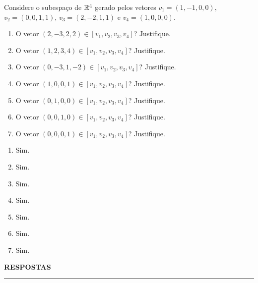 \documentclass[12pt]{exam}
\begin{document}
\begin{exercicio}
  Considere o subespaço de $\mathbb{R}^4$ gerado pelos vetores $v_1 = (1, -1, 0, 0)$, $v_2 = (0, 0, 1, 1)$, $v_3 = (2, -2, 1, 1)$ e $v_4 = (1, 0, 0, 0)$.
  \begin{enumerate}[label={\alph*})]
    \item O vetor $(2, -3, 2, 2) \in [v_1, v_2, v_3, v_4]$? Justifique.

    \item O vetor $(1, 2, 3, 4) \in [v_1, v_2, v_3, v_4]$? Justifique.

    \item O vetor $(0, -3, 1, -2) \in [v_1, v_2, v_3, v_4]$? Justifique.

    \item O vetor $(1, 0, 0, 1) \in [v_1, v_2, v_3, v_4]$? Justifique.

    \item O vetor $(0, 1, 0, 0) \in [v_1, v_2, v_3, v_4]$? Justifique.

    \item O vetor $(0, 0, 1, 0) \in [v_1, v_2, v_3, v_4]$? Justifique.

    \item O vetor $(0, 0, 0, 1) \in [v_1, v_2, v_3, v_4]$? Justifique.
  \end{enumerate}
  \begin{solucao}
    \begin{multicols}{3}
      \begin{enumerate}[label={\alph*})]
        \item Sim.

        \item Sim.

        \item Sim.

        \item Sim.

        \item Sim.

        \item Sim.

        \item Sim.
      \end{enumerate}
    \end{multicols}
  \end{solucao}
\end{exercicio}

\newpage
{}

\begin{center}
{\large\bf RESPOSTAS}
\end{center}
\hrule

\end{document}
